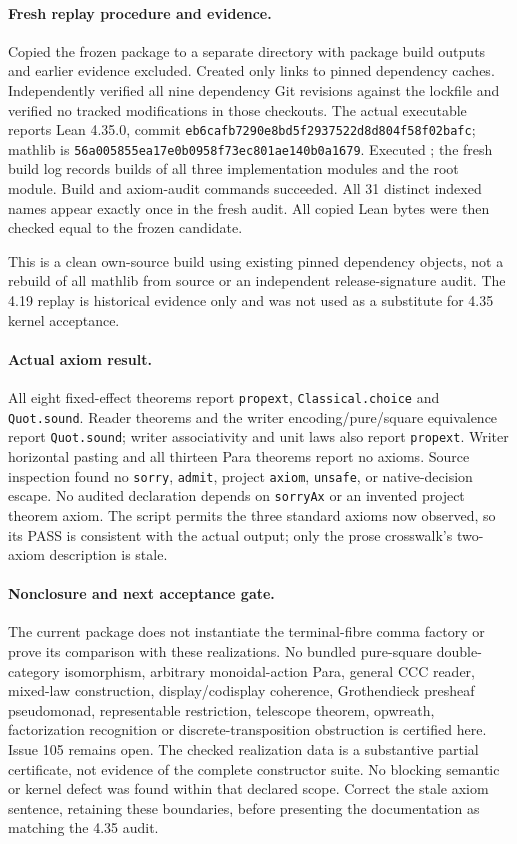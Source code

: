 \documentclass{article}
\begin{document}
\paragraph{Fresh replay procedure and evidence.}
Copied the frozen package to a separate directory with package build outputs and earlier evidence excluded. Created only links to pinned dependency caches. Independently verified all nine dependency Git revisions against the lockfile and verified no tracked modifications in those checkouts. The actual executable reports Lean 4.35.0, commit \texttt{eb6cafb7290e8bd5f2937522d8d804f58f02bafc}; mathlib is \texttt{56a005855ea17e0b0958f73ec801ae140b0a1679}. Executed ; the fresh build log records builds of all three implementation modules and the root module. Build and axiom-audit commands succeeded. All 31 distinct indexed names appear exactly once in the fresh audit. All copied Lean bytes were then checked equal to the frozen candidate.

This is a clean own-source build using existing pinned dependency objects, not a rebuild of all mathlib from source or an independent release-signature audit. The 4.19 replay is historical evidence only and was not used as a substitute for 4.35 kernel acceptance.

\paragraph{Actual axiom result.}
All eight fixed-effect theorems report \texttt{propext}, \texttt{Classical.choice} and \texttt{Quot.sound}. Reader theorems and the writer encoding/pure/square equivalence report \texttt{Quot.sound}; writer associativity and unit laws also report \texttt{propext}. Writer horizontal pasting and all thirteen Para theorems report no axioms. Source inspection found no \texttt{sorry}, \texttt{admit}, project \texttt{axiom}, \texttt{unsafe}, or native-decision escape. No audited declaration depends on \texttt{sorryAx} or an invented project theorem axiom. The script permits the three standard axioms now observed, so its PASS is consistent with the actual output; only the prose crosswalk's two-axiom description is stale.

\paragraph{Nonclosure and next acceptance gate.}
The current package does not instantiate the terminal-fibre comma factory or prove its comparison with these realizations. No bundled pure-square double-category isomorphism, arbitrary monoidal-action Para, general CCC reader, mixed-law construction, display/codisplay coherence, Grothendieck presheaf pseudomonad, representable restriction, telescope theorem, opwreath, factorization recognition or discrete-transposition obstruction is certified here. Issue 105 remains open. The checked realization data is a substantive partial certificate, not evidence of the complete constructor suite. No blocking semantic or kernel defect was found within that declared scope. Correct the stale axiom sentence, retaining these boundaries, before presenting the documentation as matching the 4.35 audit.
\end{document}
